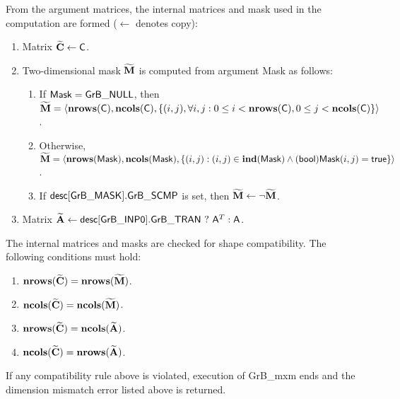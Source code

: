 From the argument matrices, the internal matrices and mask used in the computation are formed ($\leftarrow$ denotes copy):
\begin{enumerate}

	\item Matrix ${\bf \widetilde{C}} \leftarrow {\sf C}$.

	\item Two-dimensional mask ${\bf \widetilde{M}}$ is computed from argument 
    {\sf Mask} as follows:
	\begin{enumerate}

		\item	If ${\sf Mask} = {\sf GrB\_NULL}$, then ${\bf \widetilde{M}} = 
        \langle \bold{nrows}({\sf C}), \bold{ncols}({\sf C}), \{(i,j), 
        \forall i,j : 0 \leq i <  \bold{nrows}({\sf C}), 0 \leq j < \bold{ncols}({\sf C}) 
        \} \rangle$.

		\item	Otherwise, ${\bf \widetilde{M}} = \langle \bold{nrows}({\sf Mask}), 
        \bold{ncols}({\sf Mask}), \{(i,j) : (i,j) \in \bold{ind}({\sf Mask}) \wedge 
        ({\sf bool}){\sf Mask}(i,j) = {\sf true}\} \rangle$.

		\item	If ${\sf desc[GrB\_MASK].GrB\_SCMP}$ is set, then 
        ${\bf \widetilde{M}} \leftarrow \neg {\bf \widetilde{M}}$.

	\end{enumerate}

	\item Matrix ${\bf \widetilde{A}} \leftarrow {\sf desc[GrB\_INP0].GrB\_TRAN} \ ? \ {\sf A}^T : {\sf A}$.

\end{enumerate}

The internal matrices and masks are checked for shape compatibility. The following 
conditions must hold:
\begin{enumerate}
	\item $\bold{nrows}({\bf \widetilde{C}}) = \bold{nrows}({\bf \widetilde{M}})$.

	\item $\bold{ncols}({\bf \widetilde{C}}) = \bold{ncols}({\bf \widetilde{M}})$.

	\item $\bold{nrows}({\bf \widetilde{C}}) = \bold{ncols}({\bf \widetilde{A}})$.

	\item $\bold{ncols}({\bf \widetilde{C}}) = \bold{nrows}({\bf \widetilde{A}})$.
\end{enumerate}
If any compatibility rule above is violated, execution of {\sf GrB\_mxm} ends and 
the dimension mismatch error listed above is returned.


